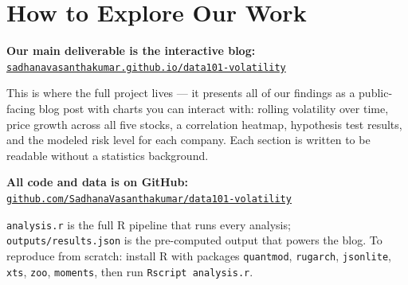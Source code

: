 \documentclass[11pt, letterpaper]{article}
\begin{document}
\section{How to Explore Our Work}

\textbf{Our main deliverable is the interactive blog:}\\
\href{https://sadhanavasanthakumar.github.io/data101-volatility/}{\texttt{sadhanavasanthakumar.github.io/data101-volatility}}

This is where the full project lives --- it presents all of our findings as a
public-facing blog post with charts you can interact with: rolling volatility
over time, price growth across all five stocks, a correlation heatmap,
hypothesis test results, and the modeled risk level for each company. Each
section is written to be readable without a statistics background.

\textbf{All code and data is on GitHub:}\\
\href{https://github.com/SadhanaVasanthakumar/data101-volatility}{\texttt{github.com/SadhanaVasanthakumar/data101-volatility}}

\texttt{analysis.r} is the full R pipeline that runs every analysis;
\texttt{outputs/results.json} is the pre-computed output that powers the blog.
To reproduce from scratch: install R with packages \texttt{quantmod},
\texttt{rugarch}, \texttt{jsonlite}, \texttt{xts}, \texttt{zoo},
\texttt{moments}, then run \texttt{Rscript analysis.r}.
\end{document}
